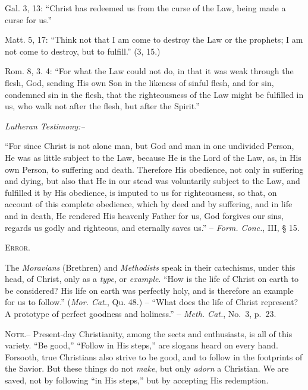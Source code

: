 \documentclass[
]{book}
\begin{document}
Gal. 3, 13: ``Christ has redeemed us from the curse of the Law, being made a curse for us.''

Matt. 5, 17: ``Think not that I am come to destroy the Law or the prophets; I am not come to destroy, but to fulfill.'' (3, 15.)

Rom. 8, 3. 4: ``For what the Law could not do, in that it was weak through the flesh, God, sending His own Son in the likeness of sinful flesh, and for sin, condemned sin in the flesh, that the righteousness of the Law might be fulfilled in us, who walk not after the flesh, but after the Spirit.''

\begin{center}
\textsl{Lutheran Testimony:--}
\end{center}

``For since Christ is not alone man, but God and man in one undivided Person, He was as little subject to the Law, because He is the Lord of the Law, as, in His own Person, to suffering and death. Therefore His obedience, not only in suffering and dying, but also that He in our stead was voluntarily subject to the Law, and fulfilled it by His obedience, is imputed to us for righteousness, so that, on account of this complete obedience, which by deed and by suffering, and in life and in death, He rendered His heavenly Father for us, God forgives our sins, regards us godly and righteous, and eternally saves us.'' -- \emph{Form. Conc.}, III, § 15.

\begin{center}
\textsc{Error.}
\end{center}

The \emph{Moravians} (Brethren) and \emph{Methodists} speak in their catechisms, under this head, of Christ, only as a \emph{type}, or \emph{example}. ``How is the life of Christ on earth to be considered? His life on earth was perfectly holy, and is therefore an example for us to follow.'' (\emph{Mor. Cat.}, Qu. 48.) -- ``What does the life of Christ represent? A prototype of perfect goodness and holiness.'' -- \emph{Meth. Cat.}, No.~3, p.~23.

\textsc{Note.--} Present-day Christianity, among the sects and enthusiasts, is all of this variety. ``Be good,'' ``Follow in His steps,'' are slogans heard on every hand. Forsooth, true Christians also strive to be good, and to follow in the footprints of the Savior. But these things do not \emph{make}, but only \emph{adorn} a Christian. We are saved, not by following ``in His steps,'' but by accepting His redemption.
\end{document}
